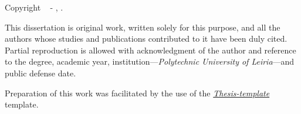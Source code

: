 
\vspace*{\fill}

\noindent \textbf{\GetTitle}
    
\noindent Copyright \textcopyright~\the\year{} - \GetAuthor, \GetDegree.

\vspace{.575em}

\noindent This dissertation is original work, written solely for this purpose, and all the authors whose studies and publications contributed to it have been duly cited. Partial reproduction is allowed with acknowledgment of the author and reference to the degree, academic year, institution---\textit{Polytechnic University of Leiria}---and public defense date.

\vspace{1.395em}

\noindent{}

\vspace{.935em}

\noindent Preparation of this work was facilitated by the use of the \href{https://github.com/thehackersbrain/thehackersbrain}{\textit{Thesis-template}} template.

\vspace*{\fill}
\MediaOptionLogic